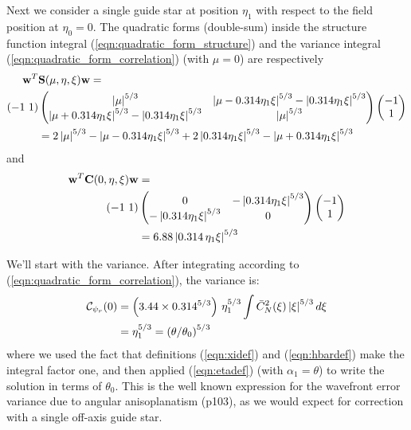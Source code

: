 \documentclass[11pt, oneside]{article}   	%
\begin{document}
Next we consider a single guide star at position $\eta_1$ with respect to the field position at $\eta_0=0$. The quadratic forms (double-sum) inside the
structure function integral (\ref{eqn:quadratic_form_structure}) and the variance integral (\ref{eqn:quadratic_form_correlation}) (with $\mu=0$) are respectively
\begin{align} {\bf w}^T& {\bf S}(\mu,\eta,\xi) {\bf w} = \nonumber \\
(-1 \ 1) &\begin{pmatrix} \left| \mu \right|^{5/3} & \left| \mu - 0.314 \eta_1 \xi \right|^{5/3} - \left|0.314 \eta_1 \xi \right|^{5/3} \\
                                     \left| \mu + 0.314 \eta_1 \xi \right|^{5/3} - \left|0.314 \eta_1 \xi \right|^{5/3} & \left| \mu \right|^{5/3}     \end{pmatrix}
                                                                   \begin{pmatrix} -1 \\ 1 \end{pmatrix} \nonumber \\
            &= 2 \left| \mu \right|^{5/3} - \left| \mu - 0.314 \eta_1 \xi \right|^{5/3} + 2\left|0.314 \eta_1 \xi \right|^{5/3} - \left| \mu + 0.314 \eta_1 \xi \right|^{5/3}
\end{align}
and
\begin{align}
 {\bf w}^T {\bf C} (0,\eta,\xi) {\bf w} &= \nonumber \\
(-1 \ 1) &\begin{pmatrix} 0                                            & -\left| 0.314 \eta_1 \xi\right|^{5/3}      \\
                                     - \left| 0.314 \eta_1\xi \right|^{5/3} &                     0                              \end{pmatrix}
                                                                  \begin{pmatrix} -1 \\ 1 \end{pmatrix} \nonumber \\
 &= 6.88 \left| 0.314\, \eta_1 \xi \right|^{5/3}
\end{align}

We'll start with the variance. After integrating according to (\ref{eqn:quadratic_form_correlation}), the variance is:
\begin{align}
{\cal C}_{\psi_r}(0) &= \left( 3.44 \times 0.314^{5/3}\right)\, \eta_1^{5/3} \int \bar C_N^2(\xi) \left | \xi \right |^{5/3} d \xi \nonumber \\
&=  \eta_1^{5/3} = \left(\theta / \theta_0 \right) ^{5/3}
\end{align}
where we used the fact that definitions (\ref{eqn:xidef}) and (\ref{eqn:hbardef}) make the integral factor one, and then applied (\ref{eqn:etadef}) (with $\alpha_1 = \theta$) to write the solution in terms of $\theta_0$. This is the well known expression for the wavefront error variance due to angular anisoplanatism \cite{Hardy1998} (p103), as we would expect for correction with a single off-axis guide star.
\end{document}
